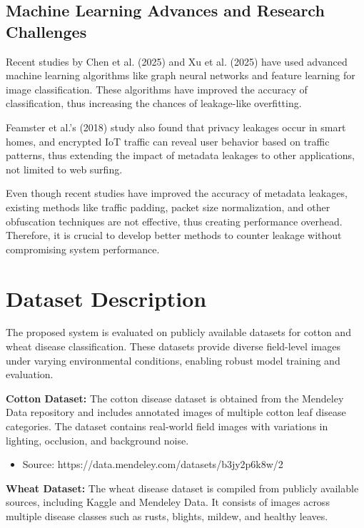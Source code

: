 \documentclass[12pt,a4paper]{report}
\begin{document}
\subsection{Machine Learning Advances and Research Challenges}
Recent studies by Chen et al. (2025) and Xu et al. (2025) have used advanced machine learning algorithms like graph neural networks and feature learning for image classification. These algorithms have improved the accuracy of classification, thus increasing the chances of leakage-like overfitting.

Feamster et al.'s (2018) study also found that privacy leakages occur in smart homes, and encrypted IoT traffic can reveal user behavior based on traffic patterns, thus extending the impact of metadata leakages to other applications, not limited to web surfing.

Even though recent studies have improved the accuracy of metadata leakages, existing methods like traffic padding, packet size normalization, and other obfuscation techniques are not effective, thus creating performance overhead. Therefore, it is crucial to develop better methods to counter leakage without compromising system performance.

\section{Dataset Description}

The proposed system is evaluated on publicly available datasets for cotton and wheat disease classification. These datasets provide diverse field-level images under varying environmental conditions, enabling robust model training and evaluation.

\textbf{Cotton Dataset:} The cotton disease dataset is obtained from the Mendeley Data repository and includes annotated images of multiple cotton leaf disease categories. The dataset contains real-world field images with variations in lighting, occlusion, and background noise.

\begin{itemize}
\item Source: https://data.mendeley.com/datasets/b3jy2p6k8w/2
\end{itemize}

\textbf{Wheat Dataset:} The wheat disease dataset is compiled from publicly available sources, including Kaggle and Mendeley Data. It consists of images across multiple disease classes such as rusts, blights, mildew, and healthy leaves.
\end{document}
